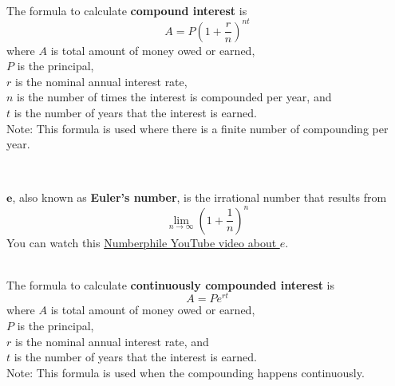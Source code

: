 \begin{myDefinition}~\\[0.5mm]
The formula to calculate {\bf compound interest} is $${A = P \left(1+\dfrac{r}{n}\right)^{nt}}$$
where $A$ is total amount of money owed or earned,\\
$P$ is the principal, \\
$r$ is the nominal annual interest rate,  \\
$n$ is the number of times the interest is compounded per year, and \\
$t$ is the number of years that the interest is earned. \\
Note: This formula is used where there is a finite number of compounding per year.
\end{myDefinition}

\begin{myDefinition}~\\[0.5mm]
\begin{minipage}{0.9\linewidth}
$\boldsymbol{e}$, also known as {\bf Euler's number}, is the irrational number that results from $$\lim\limits_{n\to \infty}\left(1+\frac{1}{n}\right)^n$$
 You can watch this \href{https://youtu.be/AuA2EAgAegE}{Numberphile YouTube video about $e$}. 
\end{minipage}
\begin{minipage}{0.1\linewidth}
\flushright {}
\end{minipage}
\end{myDefinition}



\begin{myDefinition}~\\[0.5mm]
The formula to calculate {\bf continuously compounded interest} is $${A = P e^{rt}}$$
where $A$ is total amount of money owed or earned,\\
$P$ is the principal, \\
$r$ is the nominal annual interest rate, and \\
$t$ is the number of years that the interest is earned. \\
Note: This formula is used when the compounding happens continuously.
\end{myDefinition}



